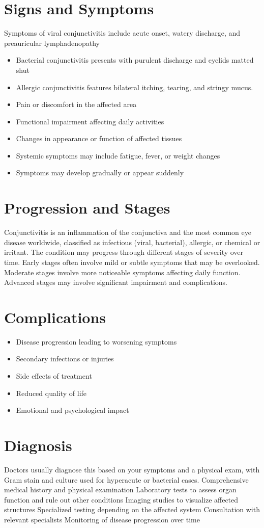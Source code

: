 \section{Signs and Symptoms}
Symptoms of viral conjunctivitis include acute onset, watery discharge, and preauricular lymphadenopathy

\begin{itemize}[noitemsep]
  \item Bacterial conjunctivitis presents with purulent discharge and eyelids matted shut
  \item Allergic conjunctivitis features bilateral itching, tearing, and stringy mucus.
  \item Pain or discomfort in the affected area
  \item Functional impairment affecting daily activities
  \item Changes in appearance or function of affected tissues
  \item Systemic symptoms may include fatigue, fever, or weight changes
  \item Symptoms may develop gradually or appear suddenly
\end{itemize}
\section{Progression and Stages}
Conjunctivitis is an inflammation of the conjunctiva and the most common eye disease worldwide, classified as infectious (viral, bacterial), allergic, or chemical or irritant. The condition may progress through different stages of severity over time. Early stages often involve mild or subtle symptoms that may be overlooked. Moderate stages involve more noticeable symptoms affecting daily function. Advanced stages may involve significant impairment and complications.
\section{Complications}
\begin{itemize}[noitemsep]
  \item Disease progression leading to worsening symptoms
  \item Secondary infections or injuries
  \item Side effects of treatment
  \item Reduced quality of life
  \item Emotional and psychological impact
\end{itemize}
\section{Diagnosis}
Doctors usually diagnose this based on your symptoms and a physical exam, with Gram stain and culture used for hyperacute or bacterial cases. Comprehensive medical history and physical examination Laboratory tests to assess organ function and rule out other conditions Imaging studies to visualize affected structures Specialized testing depending on the affected system Consultation with relevant specialists Monitoring of disease progression over time

